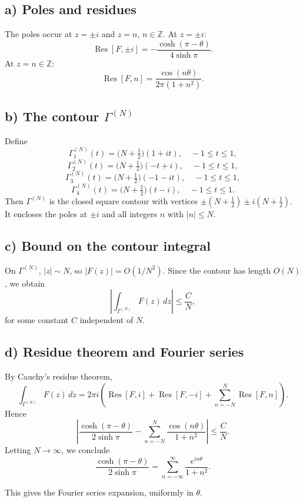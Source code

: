\documentclass[11pt,a4paper]{article}
\begin{document}
\subsection*{a) Poles and residues}
The poles occur at $z=\pm i$ and $z=n$, $n\in\mathbb{Z}$.  
At $z=\pm i$:
\[
\operatorname{Res}[F,\pm i] = -\frac{\cosh(\pi-\theta)}{4\sinh \pi}.
\]
At $z=n\in\mathbb{Z}$:
\[
\operatorname{Res}[F,n] = \frac{\cos(n\theta)}{2\pi(1+n^2)}.
\]

\subsection*{b) The contour $\Gamma^{(N)}$}
Define
\[
\Gamma^{(N)}_1(t) = \Big(N+\tfrac{1}{2}\Big)(1+it), \quad -1\leq t\leq 1,
\]
\[
\Gamma^{(N)}_2(t) = \Big(N+\tfrac{1}{2}\Big)(-t+i), \quad -1\leq t\leq 1,
\]
\[
\Gamma^{(N)}_3(t) = \Big(N+\tfrac{1}{2}\Big)(-1-it), \quad -1\leq t\leq 1,
\]
\[
\Gamma^{(N)}_4(t) = \Big(N+\tfrac{1}{2}\Big)(t-i), \quad -1\leq t\leq 1.
\]
Then $\Gamma^{(N)}$ is the closed square contour with vertices
$\pm(N+\tfrac{1}{2}) \pm i(N+\tfrac{1}{2})$.
It encloses the poles at $\pm i$ and all integers $n$ with $|n|\leq N$.

\subsection*{c) Bound on the contour integral}
On $\Gamma^{(N)}$, $|z|\sim N$, so $|F(z)|=O(1/N^2)$.  
Since the contour has length $O(N)$, we obtain
\[
\left| \int_{\Gamma^{(N)}} F(z)\,dz \right| \leq \frac{C}{N},
\]
for some constant $C$ independent of $N$.

\subsection*{d) Residue theorem and Fourier series}
By Cauchy's residue theorem,
\[
\int_{\Gamma^{(N)}} F(z)\,dz
= 2\pi i \left( \operatorname{Res}[F,i]+\operatorname{Res}[F,-i] + \sum_{n=-N}^N \operatorname{Res}[F,n]\right).
\]
Hence
\[
\left| \frac{\cosh(\pi-\theta)}{2\sinh \pi}
- \sum_{n=-N}^N \frac{\cos(n\theta)}{1+n^2} \right| \leq \frac{C}{N}.
\]
Letting $N\to\infty$, we conclude
\[
\frac{\cosh(\pi-\theta)}{2\sinh \pi}
= \sum_{n=-\infty}^\infty \frac{e^{in\theta}}{1+n^2}.
\]

This gives the Fourier series expansion, uniformly in $\theta$.
\end{document}
